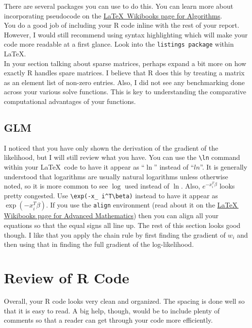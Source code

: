 \documentclass[11pt]{article}
\begin{document}
There are several packages you can use to do this. You can learn more about incorporating pseudocode on the \href{https://en.wikibooks.org/wiki/LaTeX/Algorithms}{\LaTeX\, Wikibooks page for Algorithms}.\\ 

You do a good job of including your R code inline with the rest of your report. However, I would still recommend using syntax highlighting which will make your code more readable at a first glance. Look into the \texttt{listings package} within \LaTeX. \\

In your section talking about sparse matrices, perhaps expand a bit more on how exactly R handles spare matrices. I believe that R does this by treating a matrix as an element list of non-zero entries. Also, I did not see any benchmarking done across your various solve functions. This is key to understanding the comparative computational advantages of your functions.


\subsection{GLM}

I noticed that you have only shown the derivation of the gradient of the likelihood, but I will still review what you have. You can use the \texttt{\textbackslash ln} command within your \LaTeX\, code to have it appear as ``$\ln$'' instead of ``$ln$''. It is generally understood that logarithms are usually natural logarithms unless otherwise noted, so it is more common to see $\log$ used instead of $\ln$. Also, $e^{-x_i^T \beta}$ looks pretty congested. Use \texttt{\textbackslash exp(-x\_ i\^{}T\textbackslash beta)} instead to have it appear as $\exp(-x_i^T \beta)$. If you use the \texttt{align} environment (read about it on the \href{https://en.wikibooks.org/wiki/LaTeX/Advanced_Mathematics}{\LaTeX\, Wikibooks page for Advanced Mathematics}) then you can align all your equations so that the equal signs all line up. The rest of this section looks good though. I like that you apply the chain rule by first finding the gradient of $w_i$ and then using that in finding the full gradient of the log-likelihood. \\

\section{Review of R Code}
Overall, your R code looks very clean and organized. The spacing is done well so that it is easy to read. A big help, though, would be to include plenty of comments so that a reader can get through your code more efficiently. \\
\end{document}
